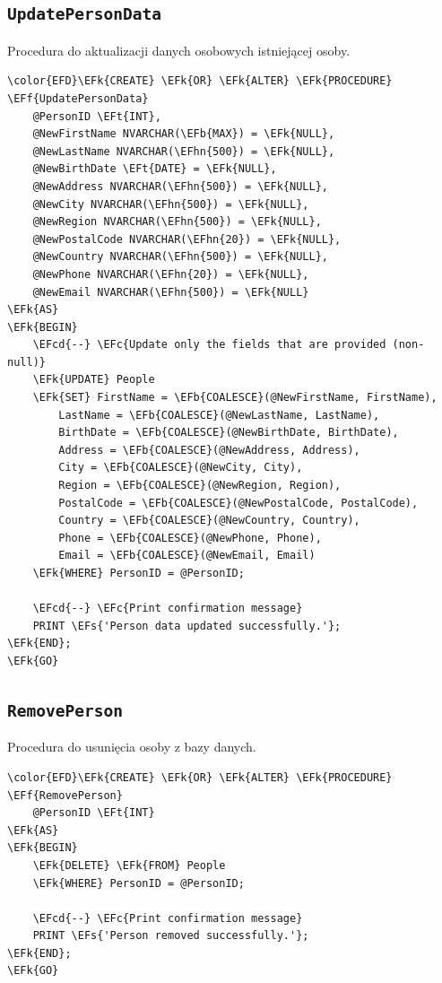 \documentclass[11pt]{article}
\newcommand{\EFc}[1]{\textcolor{EFc}{\textit{#1}}} %
\newcommand{\EFcd}[1]{\textcolor{EFcd}{\textit{#1}}} %
\newcommand{\EFs}[1]{\textcolor{EFs}{#1}} %
\newcommand{\EFk}[1]{\textcolor{EFk}{\textbf{#1}}} %
\newcommand{\EFb}[1]{\textcolor{EFb}{\textbf{#1}}} %
\newcommand{\EFf}[1]{\textcolor{EFf}{#1}} %
\newcommand{\EFt}[1]{\textcolor{EFt}{\textbf{#1}}} %
\newcommand{\EFhn}[1]{\textcolor{EFhn}{#1}} %
\begin{document}
\subsection{\texttt{UpdatePersonData}}
\label{sec:org2c8a8b6}
Procedura do aktualizacji danych osobowych istniejącej osoby.
\begin{Code}
\begin{Verbatim}
\color{EFD}\EFk{CREATE} \EFk{OR} \EFk{ALTER} \EFk{PROCEDURE} \EFf{UpdatePersonData}
    @PersonID \EFt{INT},
    @NewFirstName NVARCHAR(\EFb{MAX}) = \EFk{NULL},
    @NewLastName NVARCHAR(\EFhn{500}) = \EFk{NULL},
    @NewBirthDate \EFt{DATE} = \EFk{NULL},
    @NewAddress NVARCHAR(\EFhn{500}) = \EFk{NULL},
    @NewCity NVARCHAR(\EFhn{500}) = \EFk{NULL},
    @NewRegion NVARCHAR(\EFhn{500}) = \EFk{NULL},
    @NewPostalCode NVARCHAR(\EFhn{20}) = \EFk{NULL},
    @NewCountry NVARCHAR(\EFhn{500}) = \EFk{NULL},
    @NewPhone NVARCHAR(\EFhn{20}) = \EFk{NULL},
    @NewEmail NVARCHAR(\EFhn{500}) = \EFk{NULL}
\EFk{AS}
\EFk{BEGIN}
    \EFcd{--} \EFc{Update only the fields that are provided (non-null)}
    \EFk{UPDATE} People
    \EFk{SET} FirstName = \EFb{COALESCE}(@NewFirstName, FirstName),
        LastName = \EFb{COALESCE}(@NewLastName, LastName),
        BirthDate = \EFb{COALESCE}(@NewBirthDate, BirthDate),
        Address = \EFb{COALESCE}(@NewAddress, Address),
        City = \EFb{COALESCE}(@NewCity, City),
        Region = \EFb{COALESCE}(@NewRegion, Region),
        PostalCode = \EFb{COALESCE}(@NewPostalCode, PostalCode),
        Country = \EFb{COALESCE}(@NewCountry, Country),
        Phone = \EFb{COALESCE}(@NewPhone, Phone),
        Email = \EFb{COALESCE}(@NewEmail, Email)
    \EFk{WHERE} PersonID = @PersonID;

    \EFcd{--} \EFc{Print confirmation message}
    PRINT \EFs{'Person data updated successfully.'};
\EFk{END};
\EFk{GO}
\end{Verbatim}
\end{Code}
\subsection{\texttt{RemovePerson}}
\label{sec:orgdc0df9f}
Procedura do usunięcia osoby z bazy danych.
\begin{Code}
\begin{Verbatim}
\color{EFD}\EFk{CREATE} \EFk{OR} \EFk{ALTER} \EFk{PROCEDURE} \EFf{RemovePerson}
    @PersonID \EFt{INT}
\EFk{AS}
\EFk{BEGIN}
    \EFk{DELETE} \EFk{FROM} People
    \EFk{WHERE} PersonID = @PersonID;

    \EFcd{--} \EFc{Print confirmation message}
    PRINT \EFs{'Person removed successfully.'};
\EFk{END};
\EFk{GO}
\end{Verbatim}
\end{Code}
\end{document}
